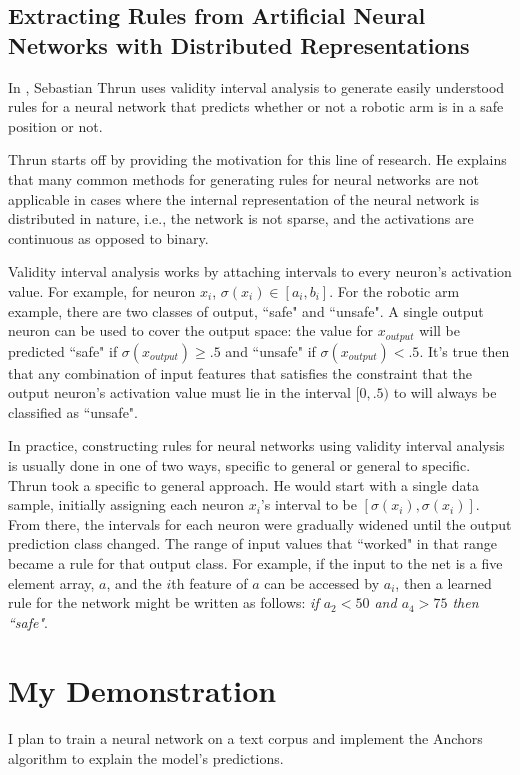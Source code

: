 \documentclass[12pt, letterpaper]{article}
\begin{document}
\subsection{Extracting Rules from Artificial Neural Networks with Distributed Representations}
	In \cite{VIA}, Sebastian Thrun uses validity interval analysis to generate easily understood rules for a neural network that predicts whether or not a robotic arm is in a safe position or not.
	
	Thrun starts off by providing the motivation for this line of research. He explains that many common methods for generating rules for neural networks are not applicable in cases where the internal representation of the neural network is distributed in nature, i.e., the network is not sparse, and the activations are continuous as opposed to binary.
	
	Validity interval analysis works by attaching intervals to every neuron's activation value.
	For example, for neuron $x_{i}$, $\sigma(x_{i}) \in [a_{i}, b_{i}]$.
	For the robotic arm example, there are two classes of output, ``safe" and ``unsafe". A single output neuron can be used to cover the output space: the value for $x_{output}$ will be predicted ``safe" if $\sigma(x_{output}) \geq .5$ and ``unsafe" if $\sigma(x_{output}) < .5$.
	It's true then that any combination of input features that satisfies the constraint that the output neuron's activation value must lie in the interval $[0, .5)$ to will always be classified as ``unsafe". 
	
	In practice, constructing rules for neural networks using validity interval analysis is usually done in one of two ways, specific to general or general to specific. Thrun took a specific to general approach. He would start with a single data sample, initially assigning each neuron $x_{i}$'s interval to be $[\sigma(x_{i}), \sigma(x_{i})]$. From there, the intervals for each neuron were gradually widened until the output prediction class changed. The range of input values that ``worked" in that range became a rule for that output class. For example, if the input to the net is a five element array, $a$, and the $i$th feature of $a$ can be accessed by $a_{i}$, then a learned rule for the network might be written as follows: \textit{if $a_{2} < 50$ and $a_{4} > 75$ then ``safe"}.
\section{My Demonstration}
\par I plan to train a neural network on a text corpus and implement the Anchors algorithm to explain the model's predictions. 
\end{document}
